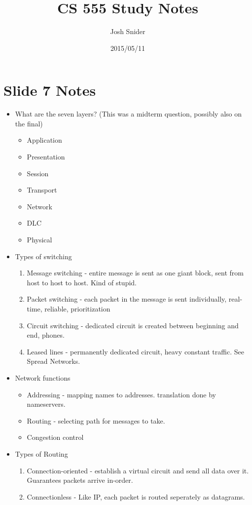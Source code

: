 \documentclass{scrartcl}
\begin{document}
\title{CS 555 Study Notes}
\author{Josh Snider}
\date{2015/05/11}
\maketitle
\section*{Slide 7 Notes}
\begin{itemize}
\item What are the seven layers? (This was a midterm question, possibly also on
 the final)
\begin{itemize}
\item Application
\item Presentation
\item Session
\item Transport
\item Network
\item DLC
\item Physical
\end{itemize}
\item Types of switching
\begin{enumerate}
\item Message switching - entire message is sent as one giant block, sent from
host to host to host. Kind of stupid.
\item Packet switching - each packet in the message is sent individually,
real-time, reliable, prioritization
\item Circuit switching - dedicated circuit is created between beginning and
end, phones.
\item Leased lines - permanently dedicated circuit, heavy constant traffic.
See Spread Networks.
\end{enumerate}
\item Network functions
\begin{itemize}
\item Addressing - mapping names to addresses. translation done by nameservers.
\item Routing - selecting path for messages to take.
\item Congestion control
\end{itemize}
\item Types of Routing
\begin{enumerate}
\item Connection-oriented - establish a virtual circuit and send all data over
it. Guarantees packets arrive in-order.
\item Connectionless - Like IP, each packet is routed seperately as datagrams.

\end{enumerate}
\end{itemize}
\end{document}
